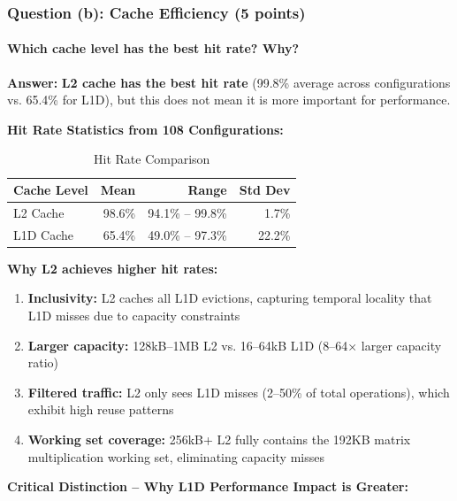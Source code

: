 \documentclass[11pt,a4paper]{article}
\begin{document}
\subsubsection{Question (b): Cache Efficiency (5 points)}

\paragraph{Which cache level has the best hit rate? Why?}

\textbf{Answer:} \textbf{L2 cache has the best hit rate} (99.8\% average across configurations vs. 65.4\% for L1D), but this does not mean it is more important for performance.

\textbf{Hit Rate Statistics from 108 Configurations:}

\begin{table}[H]
\centering
\caption{Hit Rate Comparison}
\begin{tabular}{lrrr}
\toprule
\textbf{Cache Level} & \textbf{Mean} & \textbf{Range} & \textbf{Std Dev} \\
\midrule
L2 Cache & 98.6\% & 94.1\% -- 99.8\% & 1.7\% \\
L1D Cache & 65.4\% & 49.0\% -- 97.3\% & 22.2\% \\
\bottomrule
\end{tabular}
\end{table}

\textbf{Why L2 achieves higher hit rates:}

\begin{enumerate}[noitemsep]
    \item \textbf{Inclusivity:} L2 caches all L1D evictions, capturing temporal locality that L1D misses due to capacity constraints

    \item \textbf{Larger capacity:} 128kB--1MB L2 vs. 16--64kB L1D (8--64× larger capacity ratio)

    \item \textbf{Filtered traffic:} L2 only sees L1D misses (2--50\% of total operations), which exhibit high reuse patterns

    \item \textbf{Working set coverage:} 256kB+ L2 fully contains the 192KB matrix multiplication working set, eliminating capacity misses
\end{enumerate}

\textbf{Critical Distinction -- Why L1D Performance Impact is Greater:}
\end{document}
